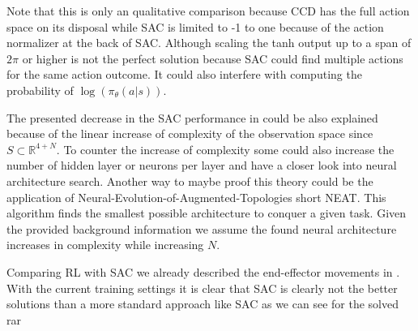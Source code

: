 Note that this is only an qualitative comparison because CCD has the full action space on its disposal while SAC is limited to -1 to one because of the action normalizer at the back of SAC. Although scaling the tanh output up to a span of $2\pi$ or higher is not the perfect solution because SAC could find multiple actions for the same action outcome. It could also interfere with computing the probability of $\log(\pi_\theta(a|s))$.

The presented decrease in the SAC performance in  could be also explained because of the linear increase of complexity of the observation space since $S \subset \mathbb{R}^{4+N}$. To counter the increase of complexity some could also increase the number of hidden layer or neurons per layer and have a closer look into neural architecture search. Another way to maybe proof this theory could be the application of Neural-Evolution-of-Augmented-Topologies short NEAT. This algorithm finds the smallest possible architecture to conquer a given task. Given the provided background information we assume the found neural architecture increases in complexity while increasing $N$.

Comparing RL with SAC we already described the end-effector movements in . With the current training settings it is clear that SAC is clearly not the better solutions than a more standard approach like SAC as we can see for the solved rar

